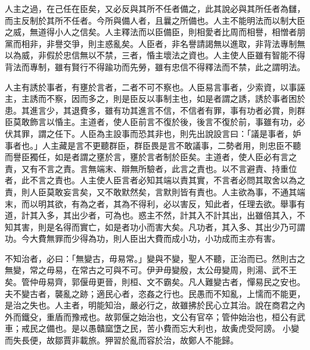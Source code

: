 
\begin{pinyinscope}
人主之過，在己任在臣矣，又必反與其所不任者備之，此其說必與其所任者為讎，而主反制於其所不任者。今所與備人者，且曩之所備也。人主不能明法而以制大臣之威，無道得小人之信矣。人主釋法而以臣備臣，則相愛者比周而相譽，相憎者朋黨而相非，非譽交爭，則主惑亂矣。人臣者，非名譽請謁無以進取，非背法專制無以為威，非假於忠信無以不禁，三者，惛主壞法之資也。人主使人臣雖有智能不得背法而專制，雖有賢行不得踰功而先勞，雖有忠信不得釋法而不禁，此之謂明法。


人主有誘於事者，有壅於言者，二者不可不察也。人臣易言事者，少索資，以事誣主，主誘而不察，因而多之，則是臣反以事制主也，如是者謂之誘，誘於事者困於患。其進言少，其退費多，雖有功其進言不信，不信者有罪，事有功者必賞，則群臣莫敢飾言以惛主。主道者，使人臣前言不復於後，後言不復於前，事雖有功，必伏其罪，謂之任下。人臣為主設事而恐其非也，則先出說設言曰：「議是事者，妒事者也。」人主藏是言不更聽群臣，群臣畏是言不敢議事，二勢者用，則忠臣不聽而譽臣獨任，如是者謂之壅於言，壅於言者制於臣矣。主道者，使人臣必有言之責，又有不言之責。言無端末、辯無所驗者，此言之責也。以不言避責、持重位者，此不言之責也。人主使人臣言者必知其端以責其實，不言者必問其取舍以為之責，則人臣莫敢妄言矣，又不敢默然矣，言默則皆有責也。人主欲為事，不通其端末，而以明其欲，有為之者，其為不得利，必以害反，知此者，任理去欲。舉事有道，計其入多，其出少者，可為也。惑主不然，計其入不計其出，出雖倍其入，不知其害，則是名得而實亡，如是者功小而害大矣。凡功者，其入多、其出少乃可謂功。今大費無罪而少得為功，則人臣出大費而成小功，小功成而主亦有害。


不知治者，必曰：「無變古，毋易常。」變與不變，聖人不聽，正治而已。然則古之無變，常之毋易，在常古之可與不可。伊尹毋變殷，太公毋變周，則湯、武不王矣。管仲毋易齊，郭偃毋更晉，則桓、文不霸矣。凡人難變古者，憚易民之安也。夫不變古者，襲亂之跡；適民心者，恣姦之行也。民愚而不知亂，上懦而不能更，是治之失也。人主者，明能知治，嚴必行之，故雖拂於民心立其治。說在商君之內外而鐵殳，重盾而豫戒也。故郭偃之始治也，文公有官卒；管仲始治也，桓公有武車；戒民之備也。是以愚贛窳墯之民，苦小費而忘大利也，故夤虎受阿謗。𨌑小變而失長便，故鄒賈非載旅。狎習於亂而容於治，故鄭人不能歸。

\end{pinyinscope}